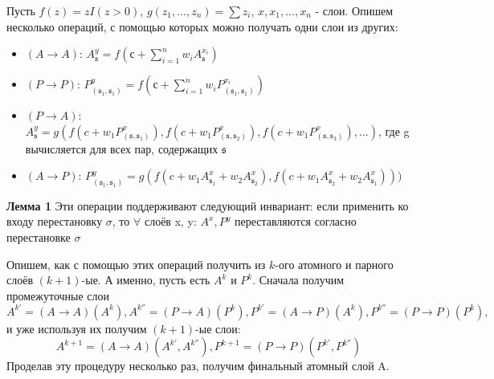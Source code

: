 \documentclass[12pt,twoside]{article}
\begin{document}
	Пусть $f(z) = z I(z > 0)$, $g(z_1,..., z_n) = \sum{z_i}$, $x, x_1,...,x_n$ - слои. Опишем несколько операций, с помощью которых можно получать одни слои из других:
	\begin{itemize}
	\item $(A\to A)$: $A^y_\mathfrak{s} = f(с+\sum_{i=1}^n {w_i A^{x_i}_\mathfrak{s}})$
	\item $(P\to P)$: $P^y_{(\mathfrak{s}_1, \mathfrak{s}_1)} = f(с+\sum_{i=1}^n {w_i P^{x_i}_{(\mathfrak{s}_1, \mathfrak{s}_1)}})$
	\item $(P\to A)$: $A^y_\mathfrak{s} = g(f(c + w_1 P^x_{(\mathfrak{s}, \mathfrak{s}_1)}), f(c + w_1 P^x_{(\mathfrak{s}, \mathfrak{s}_2)}), f(c + w_1 P^x_{(\mathfrak{s}, \mathfrak{s}_3)}),...)$, где g вычисляется для всех пар, содержащих $\mathfrak{s}$
	\item $(A\rightarrow P)$: $P^y_{(\mathfrak{s}_1, \mathfrak{s}_1)} = g(f(c + w_1 A^x_{\mathfrak{s}_1} + w_2 A^x_{\mathfrak{s}_2}), f(c + w_1 A^x_{\mathfrak{s}_2} + w_2 A^x_{\mathfrak{s}_1})))$
	\end{itemize}
	
	\textbf{Лемма 1} Эти операции поддерживают следующий инвариант: если применить ко входу перестановку $\sigma$, то $\forall$ слоёв x, y: $A^x, P^y$ переставляются согласно перестановке $\sigma$
	
	Опишем, как с помощью этих операций получить из $k$-ого атомного и парного слоёв $(k+1)$-ые. А именно, пусть есть $A^k$ и $P^k$. Сначала получим промежуточные слои $$A^{k'} = (A\to A)(A^k), A^{k''}=(P\to A)(P^k), P^{k'}=(A \to P)(A^k), P^{k''}=(P\to P)(P^k),$$ и уже используя их получим $(k+1)$-ые слои: $$A^{k+1} = (A\to A)(A^{k'}, A^{k''}), P^{k+1} = (P\to P)(P^{k'}, P^{k''})$$
Проделав эту процедуру несколько раз, получим финальный атомный слой A.
\end{document}
